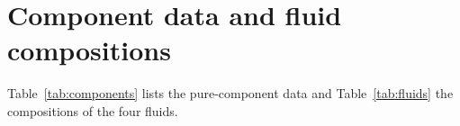 \documentclass[a4paper,fleqn]{cas-sc}
\begin{document}
\FloatBarrier
\section{Component data and fluid compositions}\label{app:data}

Table~\ref{tab:components} lists the pure-component data and Table~\ref{tab:fluids} the compositions of the four fluids.

\begin{table}[htbp]
\caption{Component data.}\label{tab:components}
\footnotesize
\resizebox{\textwidth}{!}{}

\end{table}

\begin{table}[htbp]
\caption{Fluid compositions.}\label{tab:fluids}
\footnotesize


\end{table}

\FloatBarrier



\end{document}
